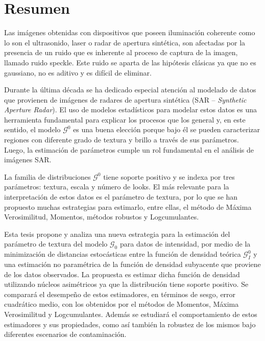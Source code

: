 
\chapter{Resumen}

Las imágenes obtenidas con dispositivos que poseen iluminación coherente como lo son el ultrasonido, laser o radar de apertura sintética, son afectadas por la presencia de un ruido que es inherente al proceso de captura de la imagen, llamado ruido speckle. Este ruido se aparta de las hipótesis clásicas ya que no es gaussiano, no es aditivo y es difícil de eliminar. 

Durante la última década se ha dedicado especial atención al modelado de datos que provienen de imágenes de radares de apertura sintética (SAR -- \textit{Synthetic Aperture Radar}). 
El uso de modelos estadísticos para modelar estos datos es una herramienta fundamental para explicar los procesos que los general y, en este sentido, el modelo $\mathcal{G}^0$ es una buena elección porque bajo él se pueden caracterizar regiones con diferente grado de textura y brillo a través de sus parámetros. Luego, la estimación de parámetros cumple un rol fundamental en el análisis de imágenes SAR.  

La familia de distribuciones $\mathcal{G}^0$ tiene soporte positivo y se indexa por tres parámetros: textura, escala y número de looks. %
El más relevante para la interpretación de estos datos es el parámetro de textura, por lo que se han propuesto muchas estrategias para estimarlo, entre ellas, el método de Máxima Verosimilitud, Momentos, métodos robustos y Logcumulantes.

Esta tesis propone y analiza una nueva estrategia para la estimación del parámetro de textura del modelo $\mathcal G_0$ para datos de intensidad, por medio de la minimización de distancias estocásticas entre la función de densidad teórica $\mathcal{G}_I^0$ y una estimación no paramétrica de la función de densidad subyacente que proviene de los datos observados. La propuesta es estimar dicha función de densidad utilizando núcleos asimétricos ya que la distribución tiene soporte positivo. Se comparará el desempeño de estos estimadores, en términos de sesgo, error cuadrático medio, con los obtenidos por el métodos de Momentos, Máxima Verosimilitud y Logcumulantes. Además se estudiará el comportamiento de estos estimadores y sus propiedades, como así también la robustez de los mismos bajo diferentes escenarios de contaminación.